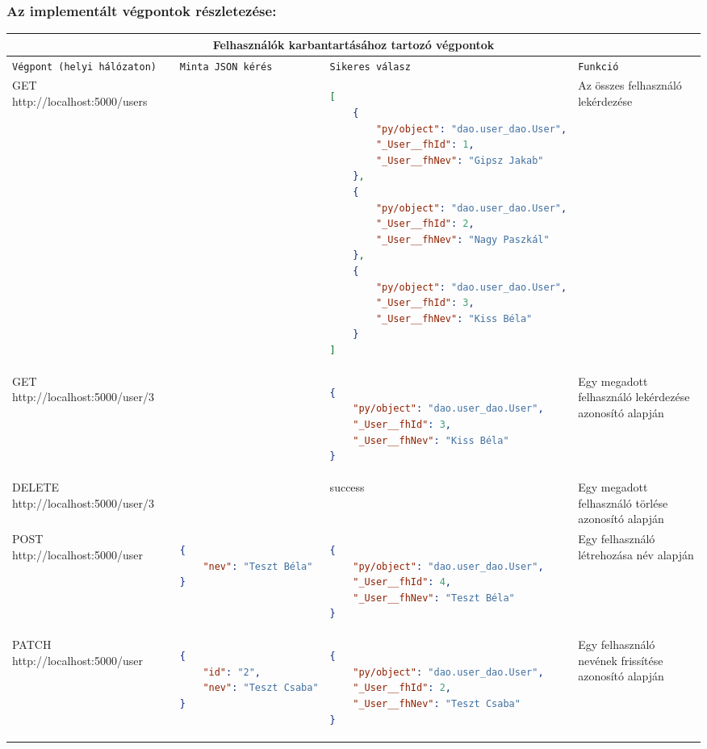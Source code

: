 \documentclass[11pt, a4paper]{article}
\begin{document}
			\subsubsection{Az implementált végpontok részletezése:}
				\begin{minipage}{\textwidth}
					\fontsize{6}{8}\selectfont
					\centering
					\begin{tabular}{|m{15em} | m{12em} | m{20em} | m{12em}|}
					\hline
					\multicolumn{4}{|c|}{\textbf{Felhasználók karbantartásához tartozó végpontok}} \\
					\hline
					\texttt{Végpont \newline{} (helyi hálózaton)} & \texttt{Minta JSON kérés} & \texttt{Sikeres válasz} & \texttt{Funkció} \\
					\hline
					GET http://localhost:5000/users &  &
					\fontsize{6}{2}\selectfont \begin{lstlisting}[language=json]
[
	{
		"py/object": "dao.user_dao.User",
		"_User__fhId": 1,
		"_User__fhNev": "Gipsz Jakab"
	},
	{
		"py/object": "dao.user_dao.User",
		"_User__fhId": 2,
		"_User__fhNev": "Nagy Paszkál"
	},
	{
		"py/object": "dao.user_dao.User",
		"_User__fhId": 3,
		"_User__fhNev": "Kiss Béla"
	}
]
					\end{lstlisting}
					& Az összes felhasználó lekérdezése \\
					\hline
					GET http://localhost:5000/user/3 &  &
\fontsize{6}{2}\selectfont \begin{lstlisting}[language=json]
{
	"py/object": "dao.user_dao.User",
	"_User__fhId": 3,
	"_User__fhNev": "Kiss Béla"
}
\end{lstlisting}
					& Egy megadott felhasználó lekérdezése azonosító alapján \\
					\hline
					DELETE http://localhost:5000/user/3 &  & success
& Egy megadott felhasználó törlése azonosító alapján \\
					\hline
					POST http://localhost:5000/user &
\fontsize{6}{2}\selectfont \begin{lstlisting}[language=json]
{
	"nev": "Teszt Béla"
}
\end{lstlisting}
					&
\fontsize{6}{2}\selectfont \begin{lstlisting}[language=json]
{
	"py/object": "dao.user_dao.User",
	"_User__fhId": 4,
	"_User__fhNev": "Teszt Béla"
}
\end{lstlisting}
& Egy felhasználó létrehozása név alapján \\
					\hline
					PATCH http://localhost:5000/user &
\fontsize{6}{2}\selectfont \begin{lstlisting}[language=json]
{
	"id": "2",
	"nev": "Teszt Csaba"
}
\end{lstlisting}
&
\fontsize{6}{2}\selectfont \begin{lstlisting}[language=json]
{
	"py/object": "dao.user_dao.User",
	"_User__fhId": 2,
	"_User__fhNev": "Teszt Csaba"
}
\end{lstlisting}
& Egy felhasználó nevének frissítése azonosító alapján \\
					\hline
					\end{tabular}
					\label{table:5}
				\end{minipage}
\end{document}
